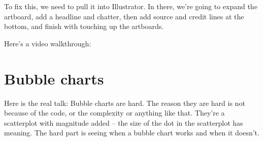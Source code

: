 \documentclass[]{book}
\newenvironment{Shaded}{\begin{snugshade}}{\end{snugshade}}
\newcommand{\DataTypeTok}[1]{\textcolor[rgb]{0.13,0.29,0.53}{#1}}
\newcommand{\DecValTok}[1]{\textcolor[rgb]{0.00,0.00,0.81}{#1}}
\newcommand{\FloatTok}[1]{\textcolor[rgb]{0.00,0.00,0.81}{#1}}
\newcommand{\KeywordTok}[1]{\textcolor[rgb]{0.13,0.29,0.53}{\textbf{#1}}}
\newcommand{\NormalTok}[1]{#1}
\newcommand{\OperatorTok}[1]{\textcolor[rgb]{0.81,0.36,0.00}{\textbf{#1}}}
\newcommand{\StringTok}[1]{\textcolor[rgb]{0.31,0.60,0.02}{#1}}
\begin{document}
\begin{Shaded}
\end{Shaded}

To fix this, we need to pull it into Illustrator. In there, we're going to expand the artboard, add a headline and chatter, then add source and credit lines at the bottom, and finish with touching up the artboards.

Here's a video walkthrough:

\hypertarget{bubble-charts}{%
\chapter{Bubble charts}\label{bubble-charts}}

Here is the real talk: Bubble charts are hard. The reason they are hard is not because of the code, or the complexity or anything like that. They're a scatterplot with magnitude added -- the size of the dot in the scatterplot has meaning. The hard part is seeing when a bubble chart works and when it doesn't.
\end{document}
